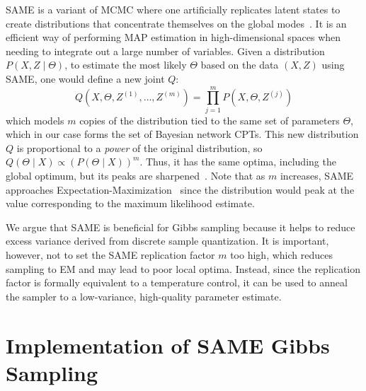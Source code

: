 \documentclass{article} %
\begin{document}
SAME is a variant of MCMC where one artificially replicates latent states to create distributions that
concentrate themselves on the global modes~\citep{SAME2002}. It is an efficient way of performing
MAP estimation in high-dimensional spaces when needing to integrate out a large number of variables.
Given a distribution $P(X,Z\mid \Theta)$, to estimate the most likely $\Theta$ based on the data
$(X,Z)$ using SAME, one would define a new joint $Q$:
\begin{equation}\label{eq:same}
Q(X,\Theta,Z^{(1)},\ldots,Z^{(m)}) = \prod_{j=1}^m P(X,\Theta,Z^{(j)})
\end{equation}
which models $m$ copies of the distribution tied to the same set of parameters $\Theta$, which in
our case forms the set of Bayesian network CPTs. This new distribution $Q$ is proportional to a
\emph{power} of the original distribution, so $Q(\Theta \mid X) \propto (P(\Theta \mid X))^m$. Thus,
it has the same optima, including the global optimum, but its peaks are sharpened~\citep{SAME2002}.
Note that as $m$ increases, SAME approaches Expectation-Maximization~\citep{EMpaper} since the
distribution would peak at the value corresponding to the maximum likelihood estimate.

We argue that SAME is beneficial for Gibbs sampling because it helps
to reduce excess variance derived from discrete sample quantization.
It is important, however, not to set the SAME replication factor $m$
too high, which reduces sampling to EM and may lead to poor local
optima. Instead, since the replication factor is formally equivalent
to a temperature control, it can be used to anneal the sampler to a
low-variance, high-quality parameter estimate.






\section{Implementation of SAME Gibbs Sampling}\label{sec:implementation}
\end{document}
